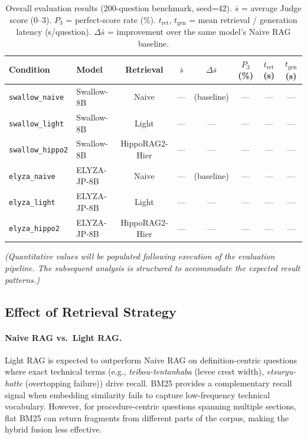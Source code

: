 \documentclass[twocolumn]{article}
\begin{document}
\begin{table}[t]
  \centering
  \setlength{\tabcolsep}{4pt}
  \caption{Overall evaluation results (200-question benchmark, seed=42).
    $\bar{s}$ = average Judge score (0--3).
    $P_3$ = perfect-score rate (\%).
    $t_{\mathrm{ret}}$, $t_{\mathrm{gen}}$ = mean retrieval / generation latency (s/question).
    $\Delta\bar{s}$ = improvement over the same model's Naive RAG baseline.}
  \label{tab:overall}
  \begin{tabular}{@{}llcccccc@{}}
    \toprule
    Condition & Model & Retrieval
      & $\bar{s}$ & $\Delta\bar{s}$
      & $P_3$ (\%) & $t_{\mathrm{ret}}$ (s) & $t_{\mathrm{gen}}$ (s) \\
    \midrule
    \texttt{swallow\_naive}
      & Swallow-8B  & Naive
      & --- & (baseline) & --- & --- & --- \\
    \texttt{swallow\_light}
      & Swallow-8B  & Light
      & --- & --- & --- & --- & --- \\
    \texttt{swallow\_hippo2}
      & Swallow-8B  & HippoRAG2-Hier
      & --- & --- & --- & --- & --- \\
    \midrule
    \texttt{elyza\_naive}
      & ELYZA-JP-8B & Naive
      & --- & (baseline) & --- & --- & --- \\
    \texttt{elyza\_light}
      & ELYZA-JP-8B & Light
      & --- & --- & --- & --- & --- \\
    \texttt{elyza\_hippo2}
      & ELYZA-JP-8B & HippoRAG2-Hier
      & --- & --- & --- & --- & --- \\
    \bottomrule
  \end{tabular}
\end{table}

\textit{(Quantitative values will be populated following execution of the evaluation pipeline.
The subsequent analysis is structured to accommodate the expected result patterns.)}

\subsection{Effect of Retrieval Strategy}

\paragraph{Naive RAG vs.\ Light RAG.}
Light RAG is expected to outperform Naive RAG on definition-centric questions
where exact technical terms (e.g., \textit{teibou-tentanhaba} (levee crest width), \textit{etsuryu-hatte} (overtopping failure)) drive recall.
BM25 provides a complementary recall signal when embedding similarity fails to
capture low-frequency technical vocabulary.
However, for procedure-centric questions spanning multiple sections, flat BM25
can return fragments from different parts of the corpus, making the hybrid
fusion less effective.
\end{document}
